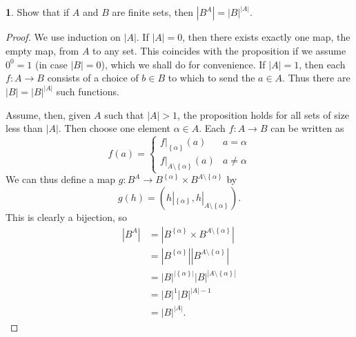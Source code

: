 \documentclass{article}
\newcounter{section-number}
\theoremstyle{definition}
\newtheorem{ex}{}[section-number]
\begin{document}
\begin{ex}
	Show that if $A$ and $B$ are finite sets, then $|B^A| = |B|^{|A|}$.
\end{ex}
\begin{proof}
	We use induction on $|A|$.
	If $|A| = 0$, then there exists exactly one map, the empty map, from $A$ to any set.
	This coincides with the proposition if we assume $0^0 = 1$ (in case $|B| = 0$), which we shall do for convenience.
	If $|A| = 1$, then each $f: A \to B$ consists of a choice of $b \in B$ to which to send the $a \in A$.
	Thus there are $|B| = |B|^{|A|}$ such functions.

	Assume, then, given $A$ such that $|A| > 1$, the proposition holds for all sets of size less than $|A|$.
	Then choose one element $\alpha \in A$.
	Each $f: A \to B$ can be written as \begin{equation*}
		f(a) = \begin{cases}
			f|_{\left\lbrace \alpha \right\rbrace}(a)              & a = \alpha    \\
			f|_{A \setminus \left\lbrace \alpha \right\rbrace} (a) & a \neq \alpha
		\end{cases}
	\end{equation*}
	We can thus define a map $g: B^A \to B^{\left\lbrace \alpha \right\rbrace} \times B^{A \setminus \left\lbrace \alpha \right\rbrace}$ by \begin{equation*}
		g(h) = \left( h|_{\left\lbrace \alpha \right\rbrace}, h|_{A \setminus \left\lbrace \alpha \right\rbrace} \right).
	\end{equation*}
	This is clearly a bijection, so \begin{align*}
		|B^A| & = |B^{\left\lbrace \alpha \right\rbrace} \times B^{A \setminus \left\lbrace \alpha \right\rbrace}| \\
		      & = |B^{\left\lbrace \alpha \right\rbrace}| |B^{A \setminus \left\lbrace \alpha \right\rbrace}|      \\
		      & = |B|^{|\left\lbrace \alpha \right\rbrace|} |B|^{|A \setminus \left\lbrace \alpha \right\rbrace|}  \\
		      & = |B|^1 |B|^{|A| - 1}                                                                              \\
		      & = |B|^{|A|}.
	\end{align*}
\end{proof}
\end{document}
